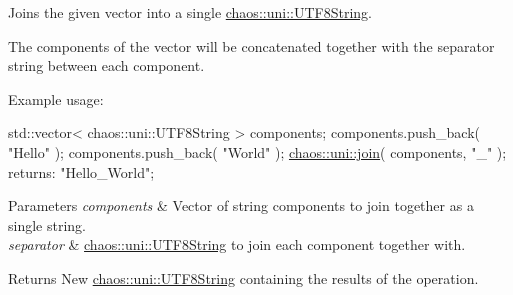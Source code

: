 Joins the given vector into a single \hyperlink{classchaos_1_1uni_1_1_u_t_f8_string}{chaos\+::uni\+::\+U\+T\+F8\+String}. 

The components of the vector will be concatenated together with the separator string between each component.

Example usage\+:


\begin{DoxyCode}
std::vector< chaos::uni::UTF8String > components;
components.push\_back( \textcolor{stringliteral}{"Hello"} );
components.push\_back( \textcolor{stringliteral}{"World"} );
\hyperlink{namespacechaos_1_1uni_ad2a77983423c8b10e2b18cae6f35d329}{chaos::uni::join}( components, \textcolor{stringliteral}{"\_"} ); returns: \textcolor{stringliteral}{"Hello\_World"};
\end{DoxyCode}



\begin{DoxyParams}{Parameters}
{\em components} & Vector of string components to join together as a single string. \\
\hline
{\em separator} & \hyperlink{classchaos_1_1uni_1_1_u_t_f8_string}{chaos\+::uni\+::\+U\+T\+F8\+String} to join each component together with. \\
\hline
\end{DoxyParams}
\begin{DoxyReturn}{Returns}
New \hyperlink{classchaos_1_1uni_1_1_u_t_f8_string}{chaos\+::uni\+::\+U\+T\+F8\+String} containing the results of the operation. 
\end{DoxyReturn}
